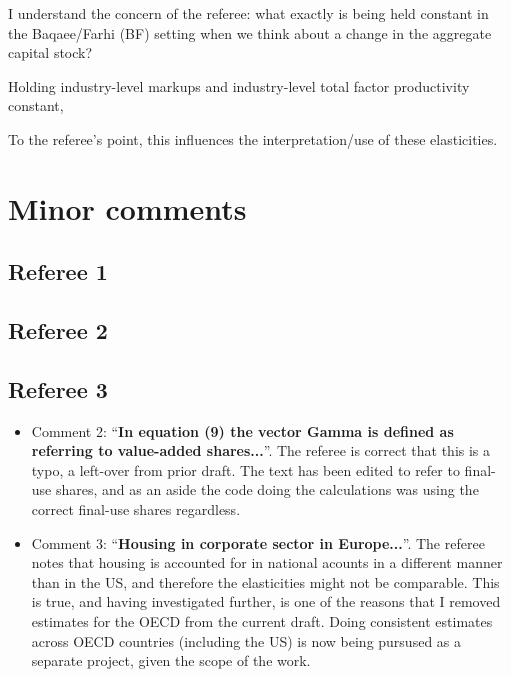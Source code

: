 \documentclass[11pt]{article}
\begin{document}
I understand the concern of the referee: what exactly is being held constant in the Baqaee/Farhi (BF) setting when we think about a change in the aggregate capital stock? 

Holding industry-level markups and industry-level total factor productivity constant, 

To the referee's point, this influences the interpretation/use of these elasticities. 

\section{Minor comments}
\subsection{Referee 1}

\subsection{Referee 2}

\subsection{Referee 3}
\begin{itemize}
	\item Comment 2: ``\textbf{In equation (9) the vector Gamma is defined as referring to value-added shares...}''. The referee is correct that this is a typo, a left-over from prior draft. The text has been edited to refer to final-use shares, and as an aside the code doing the calculations was using the correct final-use shares regardless. 
	\item Comment 3: ``\textbf{Housing in corporate sector in Europe...}''. The referee notes that housing is accounted for in national acounts in a different manner than in the US, and therefore the elasticities might not be comparable. This is true, and having investigated further, is one of the reasons that I removed estimates for the OECD from the current draft. Doing consistent estimates across OECD countries (including the US) is now being pursused as a separate project, given the scope of the work.
\end{itemize}
\end{document}
